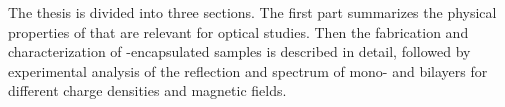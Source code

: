 The thesis is divided into three sections. The first part summarizes the physical properties of \tmds that are relevant for optical studies. Then the fabrication and characterization of \hbn-encapsulated samples is described in detail, followed by experimental analysis of the reflection and \pl spectrum of \wse mono- and bilayers for different charge densities and magnetic fields.




